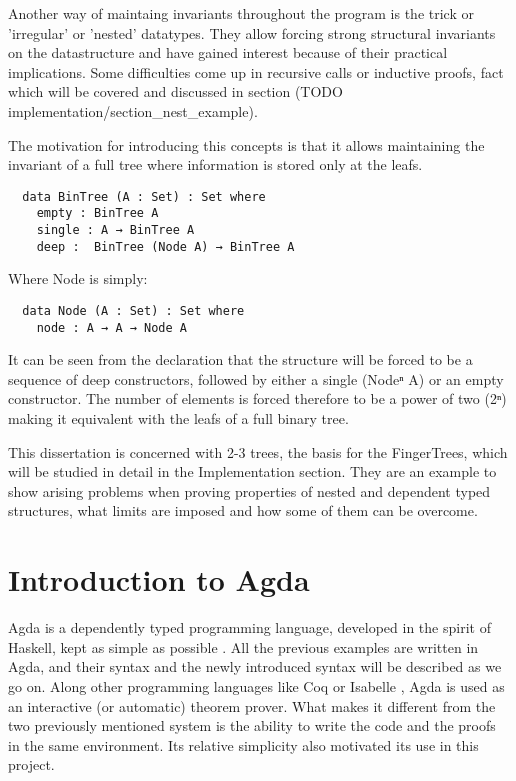 \documentclass[12pt,twoside,notitlepage]{report}
\begin{document}
Another way of maintaing invariants throughout the program is the trick or 'irregular'
or 'nested' datatypes. They allow forcing strong structural invariants on the datastructure
and have gained interest because of their practical implications. \cite{birdmeertens}
Some difficulties come up in recursive calls or inductive proofs, fact which will be
covered and discussed in section (TODO implementation/section_nest_example).

The motivation for introducing this concepts is that it allows maintaining
the invariant of a full tree where information is stored only at the leafs.

\begin{verbatim}
  data BinTree (A : Set) : Set where
    empty : BinTree A
    single : A → BinTree A
    deep :  BinTree (Node A) → BinTree A
\end{verbatim}
Where Node is simply:
\begin{verbatim}
  data Node (A : Set) : Set where
    node : A → A → Node A
\end{verbatim}

It can be seen from the declaration that the structure will be forced to be a sequence of deep
constructors, followed by either a single (Nodeⁿ A) or an empty constructor. The number
of elements is forced therefore to be a power of two (2ⁿ) making it equivalent with the leafs of a full
binary tree.

This dissertation is concerned with 2-3 trees, the basis for the FingerTrees, which
will be studied in detail in the Implementation section. They are an example to show arising problems
when proving properties of nested and dependent typed structures, what limits are imposed and how
some of them can be overcome.

\section{Introduction to Agda}

Agda is a dependently typed programming language, developed in the spirit of Haskell, kept as
simple as possible \cite{ulf}.
All the previous examples are written in Agda, and their syntax and the newly introduced syntax
will be described as we go on.
Along other programming languages like Coq \cite{coq} or Isabelle \cite{isabelle}, Agda is used as
an interactive (or automatic) theorem prover. What makes it different from the two previously
mentioned system is the ability to write the code and the proofs in the same environment. Its relative
simplicity also motivated its use in this project.
\end{document}
